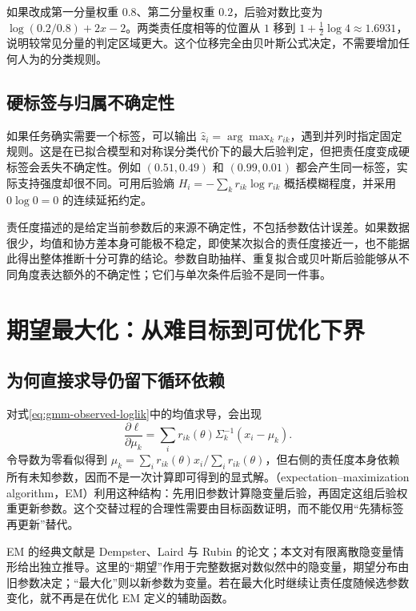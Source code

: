 \documentclass[UTF8]{ctexart}
\begin{document}
如果改成第一分量权重 $0.8$、第二分量权重 $0.2$，后验对数比变为 $\log(0.2/0.8)+2x-2$。两类责任度相等的位置从 $1$ 移到 $1+\tfrac12\log4\approx1.6931$，说明较常见分量的判定区域更大。这个位移完全由贝叶斯公式决定，不需要增加任何人为的分类规则。

\subsection{硬标签与归属不确定性}
如果任务确实需要一个标签，可以输出 $\widehat z_i=\arg\max_kr_{ik}$，遇到并列时指定固定规则。这是在已拟合模型和对称误分类代价下的最大后验判定，但把责任度变成硬标签会丢失不确定性。例如 $(0.51,0.49)$ 和 $(0.99,0.01)$ 都会产生同一标签，实际支持强度却很不同。可用后验熵 $H_i=-\sum_kr_{ik}\log r_{ik}$ 概括模糊程度，并采用 $0\log0=0$ 的连续延拓约定。

责任度描述的是给定当前参数后的来源不确定性，不包括参数估计误差。如果数据很少，均值和协方差本身可能极不稳定，即使某次拟合的责任度接近一，也不能据此得出整体推断十分可靠的结论。参数自助抽样、重复拟合或贝叶斯后验能够从不同角度表达额外的不确定性；它们与单次条件后验不是同一件事。

\section{期望最大化：从难目标到可优化下界}
\label{sec:gmm-em-principle}

\subsection{为何直接求导仍留下循环依赖}
对式\eqref{eq:gmm-observed-loglik}中的均值求导，会出现
\[
\frac{\partial\ell}{\partial\mu_k}
=\sum_i r_{ik}(\theta)\Sigma_k^{-1}(x_i-\mu_k).
\]
令导数为零看似得到 $\mu_k=\sum_i r_{ik}(\theta)x_i/\sum_i r_{ik}(\theta)$，但右侧的责任度本身依赖所有未知参数，因而不是一次计算即可得到的显式解。（expectation--maximization algorithm，EM）利用这种结构：先用旧参数计算隐变量后验，再固定这组后验权重更新参数。这个交替过程的合理性需要由目标函数证明，而不能仅用“先猜标签再更新”替代。

EM 的经典文献是 Dempster、Laird 与 Rubin 的论文\cite{dempster1977}；本文对有限离散隐变量情形给出独立推导。这里的“期望”作用于完整数据对数似然中的隐变量，期望分布由旧参数决定；“最大化”则以新参数为变量。若在最大化时继续让责任度随候选参数变化，就不再是在优化 EM 定义的辅助函数。
\end{document}
